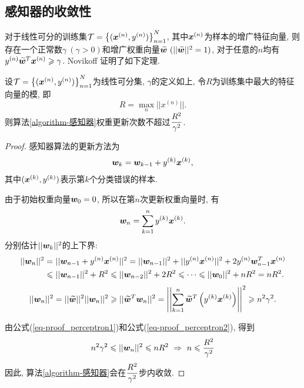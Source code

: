 \documentclass[12pt, a4paper, oneside]{ctexart}
\begin{document}
\subsection{感知器的收敛性}
对于线性可分的训练集$\mathcal{T} = \left\{(\boldsymbol{x}^{(n)}, y^{(n)})\right\}_{n=1}^N$, 其中$\boldsymbol{x}^{(n)}$为样本的增广特征向量, 则存在一个正常数$\gamma\ (\gamma > 0)$和增广权重向量$\widetilde{\boldsymbol{w}}\ (||\widetilde{\boldsymbol{w}}||^2 = 1)$, 对于任意的$n$均有$y^{(n)}\widetilde{\boldsymbol{w}}^T\boldsymbol{x}^{(n)}\geqslant \gamma$. Novikoff \cite{ref-prove_perceptron}证明了如下定理.
\begin{theorem}[感知器收敛性]
    设$\mathcal{T} = \left\{(\boldsymbol{x}^{(n)}, y^{(n)})\right\}_{n=1}^N$为线性可分集, $\gamma$的定义如上, 令$R$为训练集中最大的特征向量的模, 即
    \begin{equation*}
        R = \max_{n}||x^{(n)}||.
    \end{equation*}
    则算法\ref{algorithm-感知器}权重更新次数不超过$\displaystyle \frac{R^2}{\gamma^2}$.
\end{theorem}
\begin{proof}
    感知器算法的更新方法为
    \begin{equation}
        \boldsymbol{w}_k = \boldsymbol{w}_{k-1}+y^{(k)}\boldsymbol{x}^{(k)},
    \end{equation}
    其中$(\boldsymbol{x}^{(k)}, y^{(k)})$表示第$k$个分类错误的样本.

    由于初始权重向量$\boldsymbol{w}_0 = 0$, 所以在第$n$次更新权重向量时, 有
    \begin{equation}
        \boldsymbol{w}_n = \sum_{k=1}^ny^{(k)}\boldsymbol{x}^{(k)}.
    \end{equation}
    分别估计$||\boldsymbol{w}_k||^2$的上下界:
    \begin{align}
        ||\bd{w}_n||^2 =&\ ||\bd{w}_{n-1}+y^{(n)}\bd{x}^{(n)}||^2 = ||\bd{w}_{n-1}||^2+||y^{(n)}\bd{x}^{(n)}||^2+2y^{(n)}\bd{w}_{n-1}^T\bd{x}^{(n)}\nonumber\\
        \label{eq-proof_perceptron1}\leqslant &\ ||\bd{w}_{n-1}||^2+R^2\leqslant ||\bd{w}_{n-2}||^2+2R^2\leqslant\cdots\leqslant ||\bd{w}_0||^2+nR^2 = nR^2.
    \end{align}
    \begin{align}
        \label{eq-proof_perceptron2}||\boldsymbol{w}_n||^2=||\widetilde{\boldsymbol{w}}||^2||\boldsymbol{w}_n||^2\geqslant ||\widetilde{\boldsymbol{w}}^T\boldsymbol{w}_n||^2 = \left|\left|\sum_{k=1}^n\widetilde{\boldsymbol{w}}^T\left(y^{(k)}\boldsymbol{x}^{(k)}\right)\right|\right|^2\geqslant n^2\gamma^2.
    \end{align}

    由公式(\ref{eq-proof_perceptron1})和公式(\ref{eq-proof_perceptron2}), 得到
    \begin{equation*}
        n^2\gamma^2\leqslant ||\boldsymbol{w}_n||^2\leqslant nR^2\ \Rightarrow\ n\leqslant \frac{R^2}{\gamma^2}
    \end{equation*}
    因此, 算法\ref{algorithm-感知器}会在$\displaystyle \frac{R^2}{\gamma^2}$步内收敛.
\end{proof}
\end{document}
